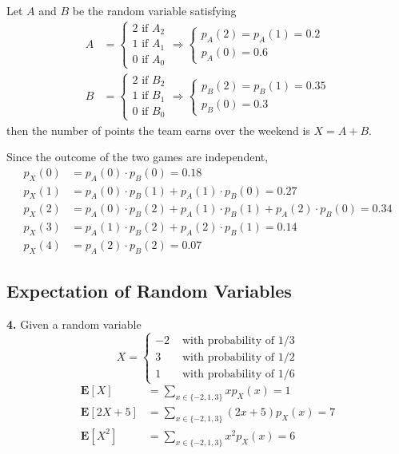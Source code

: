 \documentclass[a4paper,12pt]{article}
\newcommand{\E}{\mathbf E}
\newcommand{\exercise}[1]{\noindent\textbf{#1.}}
\begin{document}
Let $A$ and $B$ be the random variable satisfying
\begin{align*}
  A &= \begin{cases}
    2\text{ if }A_2\\
    1\text{ if }A_1\\
    0\text{ if }A_0
  \end{cases}
  \Longrightarrow\begin{cases}
    p_A(2) = p_A(1) = 0.2\\
    p_A(0) = 0.6
  \end{cases}\\
  B &= \begin{cases}
    2\text{ if }B_2\\
    1\text{ if }B_1\\
    0\text{ if }B_0
  \end{cases}
  \Longrightarrow\begin{cases}
    p_B(2) = p_B(1) = 0.35\\
    p_B(0) = 0.3
  \end{cases}
\end{align*}
then the number of points the team earns over the weekend is $X = A + B$.

Since the outcome of the two games are independent,
\begin{align*}
  p_X(0) &= p_A(0)\cdot p_B(0) = 0.18\\
  p_X(1) &= p_A(0)\cdot p_B(1) + p_A(1)\cdot p_B(0) = 0.27\\
  p_X(2) &= p_A(0)\cdot p_B(2) + p_A(1)\cdot p_B(1) + p_A(2)\cdot p_B(0)
          = 0.34\\
  p_X(3) &= p_A(1)\cdot p_B(2) + p_A(2)\cdot p_B(1) = 0.14\\
  p_X(4) &= p_A(2)\cdot p_B(2) = 0.07
\end{align*}

\subsection{Expectation of Random Variables}
\exercise 4  Given a random variable
\[X = \begin{cases}
  -2&\text{ with probability of 1/3}\\
  3&\text{ with probability of 1/2}\\
  1&\text{ with probability of 1/6}
\end{cases}\]
\begin{align*}
  \E[X] &= \sum_{x\in\{-2, 1, 3\}}xp_X(x) = 1\\
  \E[2X+5] &= \sum_{x\in\{-2, 1, 3\}}(2x + 5)p_X(x) = 7\\
  \E\left[X^2\right] &= \sum_{x\in\{-2, 1, 3\}}x^2 p_X(x) = 6
\end{align*}
\end{document}
